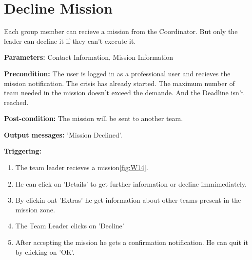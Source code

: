 \section{Decline Mission}
\label{operation:DeclineMission}
Each group member can recieve a mission from the Coordinator. But only the
leader can decline it if they can't execute it.\\
\begin{description}
\item \textbf{Parameters:} Contact Information, Mission Information
\item \textbf{Precondition:} The user is logged in as a professional user
and recieves the mission notification. The crisis has already started. The
maximum number of team needed in the mission doesn't exceed the demande. And the
Deadline isn't reached.
\item \textbf{Post-condition:} The mission will be sent to another team.
\item \textbf{Output messages:} 'Mission Declined'.
\item \textbf{Triggering:}
\begin{enumerate}
\item The team leader recieves a mission\ref{fig:W14}.
\item He can click on 'Details' to get further information or decline
immimediately.
\item By clickin ont 'Extras' he get information about other teams present in
the mission zone.
\item The Team Leader clicks on 'Decline'
\item After accepting the mission he gets a confirmation notification. He can
quit it by clicking on 'OK'.
\end{enumerate}
\end{description}  

